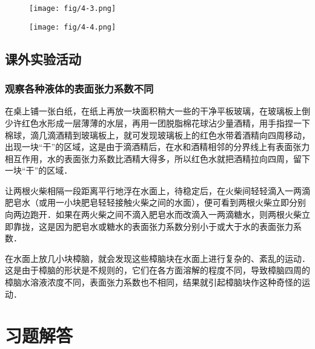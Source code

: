 \begin{figure}[htp]\centering
    \begin{minipage}[t]{0.48\textwidth}
    \centering
\texttt{[image: fig/4-3.png]}
    \caption{}
    \end{minipage}
    \begin{minipage}[t]{0.48\textwidth}
    \centering
\texttt{[image: fig/4-4.png]}
    \caption{}
    \end{minipage}
    \end{figure}

\subsection{课外实验活动}
\subsubsection{观察各种液体的表面张力系数不同}

在桌上铺一张白纸，在纸上再放一块面积稍大一些的干净平板玻璃，在玻璃板上倒少许红色水形成一层薄薄的水层，再用一团脱脂棉花球沾少量酒精，用手指捏一下棉球，滴几滴酒精到玻璃板上，就可发现玻璃板上的红色水带着酒精向四周移动，出现一块“干”的区域，这是由于滴酒精后，在水和酒精相邻的分界线上有表面张力相互作用，水的表面张力系数比酒精大得多，所以红色水就把酒精拉向四周，留下一块“干”的区域．

让两根火柴相隔一段距离平行地浮在水面上，待稳定后，在火柴间轻轻滴入一两滴肥皂水（或用一小块肥皂轻轻接触火柴之间的水面），便可看到两根火柴立即分别向两边跑开．如果在两火柴之间不滴入肥皂水而改滴入一两滴糖水，则两根火柴立即靠拢，这是因为肥皂水或糖水的表面张力系数分别小于或大于水的表面张力系数．

在水面上放几小块樟脑，就会发现这些樟脑块在水面上进行复杂的、紊乱的运动．这是由于樟脑的形状是不规则的，它们在各方面溶解的程度不同，导致樟脑四周的樟脑水溶液浓度不同，表面张力系数也不相同，结果就引起樟脑块作这种奇怪的运动．


\section{习题解答}
